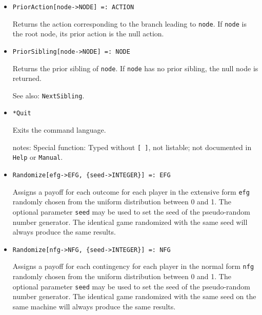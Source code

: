 \begin{itemize}
\item{}
\protect \large \begin{verbatim}
PriorAction[node->NODE] =: ACTION
\end{verbatim} \normalsize

\bd
Returns the action corresponding to the branch leading to \verb+node+.
If \verb+node+ is the root node, its prior action is the null action.
\ed

\item{}
\protect \large \begin{verbatim}
PriorSibling[node->NODE] =: NODE
\end{verbatim}\normalsize

\bd
Returns the prior sibling of \verb+node+.  If \verb+node+ has
no prior sibling, the null node is returned.
\item [See also:] \verb+NextSibling+.
\ed




\item{}
\protect \large \begin{verbatim}
*Quit
\end{verbatim}\normalsize

\bd
Exits the command language.  
\item [notes:] Special function:  Typed without \verb+[ ]+, not
listable; not documented in \verb+Help+ or \verb+Manual+.  
\ed


\item{}
\protect \large \begin{verbatim}
Randomize[efg->EFG, {seed->INTEGER}] =: EFG
\end{verbatim}\normalsize

\bd
Assigns a payoff for each outcome for each player in the
extensive form \verb+efg+ randomly chosen from the uniform distribution
between 0 and 1.  The optional parameter \verb+seed+ may be used to
set the seed of the pseudo-random number generator.  The identical game
randomized with the same seed will always produce
the same results.
\ed

\item{}
\protect \large \begin{verbatim}
Randomize[nfg->NFG, {seed->INTEGER}] =: NFG
\end{verbatim}\normalsize

\bd
Assigns a payoff for each contingency for each player in
the normal form \verb+nfg+ randomly chosen from the uniform distribution
between 0 and 1.  The optional parameter \verb+seed+ may be used to
set the seed of the pseudo-random number generator.  The identical game
randomized with the same seed on the same machine will always produce
the same results.
\ed


\end{itemize}
